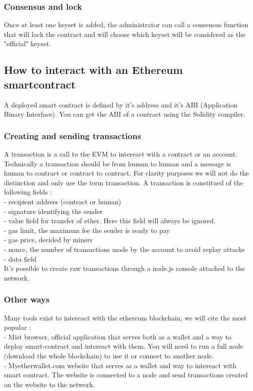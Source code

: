 \documentclass[11pt, a4paper, twoside, openright]{book} %
\begin{document}
\subsubsection{Consensus and lock}
Once at least one keyset is added, the administrator can call a consensus function that will lock the contract and will choose which keyset will be considered as the "official" keyset.


\subsection{How to interact with an Ethereum smartcontract}
A deployed smart contract is defined by it's address and it's ABI (Application Binary Interface). You can get the ABI of a contract using the Solidity compiler.
\subsubsection{Creating and sending transactions}
A transaction is a call to the EVM to intereact with a contract or an account. Technically a transaction should be from human to human and a message is human to contract or contract to contract. For clarity purposes we will not do the distinction and only use the term transaction. A transaction is constitued of the following fields : \\
- recipient address (contract or human) \\
- signature identifying the sender \\
- value field for transfer of ether. Here this field will always be ignored.\\
- gas limit, the maximum fee the sender is ready to pay \\
- gas price, decided by miners \\
- nonce, the number of transactions made by the account to avoid replay attacks\\
- data field \\

It's possible to create raw transactions through a node.js console attached to the network.


\subsubsection{Other ways}
Many tools exist to intereact with the ethereum blockchain, we will cite the most popular : \\
- Mist browser, official application that serves both as a wallet and a way to deploy smart-contract and intereact with them. You will need to run a full node (download the whole blockchain) to use it or connect to another node.\\
- Myetherwallet.com website that serves as a wallet and way to intereact with smart contract. The website is connected to a node and send transactions created on the website to the network.
\end{document}

